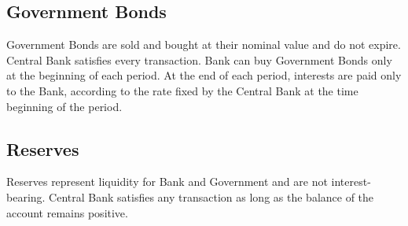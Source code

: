 \documentclass[a4paper, headings=standardclasses]{scrartcl}
\begin{document}
\subsection{Government Bonds}
Government Bonds are sold and bought at their nominal value and do not expire. Central Bank satisfies every transaction. Bank can buy Government Bonds only at the beginning of each period. At the end of each period, interests are paid only to the Bank, according to the rate fixed by the Central Bank at the time beginning of the period.

\subsection{Reserves}
Reserves represent liquidity for Bank and Government and are not interest-bearing. Central Bank satisfies any transaction as long as the balance of the account remains positive.
\end{document}
